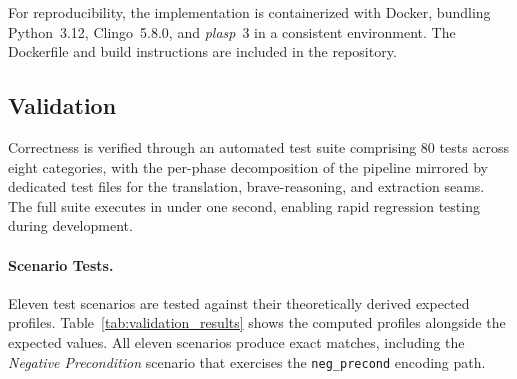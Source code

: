 For reproducibility, the implementation is containerized with Docker, bundling Python~3.12, Clingo~5.8.0, and \textit{plasp}~3 in a consistent environment. The Dockerfile and build instructions are included in the repository.

\subsection{Validation}
\label{sec:validation}

Correctness is verified through an automated test suite comprising 80 tests across eight categories, with the per-phase decomposition of the pipeline mirrored by dedicated test files for the translation, brave-reasoning, and extraction seams. The full suite executes in under one second, enabling rapid regression testing during development.

\paragraph{Scenario Tests.}
Eleven test scenarios are tested against their theoretically derived expected profiles. Table~\ref{tab:validation_results} shows the computed profiles alongside the expected values. All eleven scenarios produce exact matches, including the \textit{Negative Precondition} scenario that exercises the \texttt{neg\_precond} encoding path.

